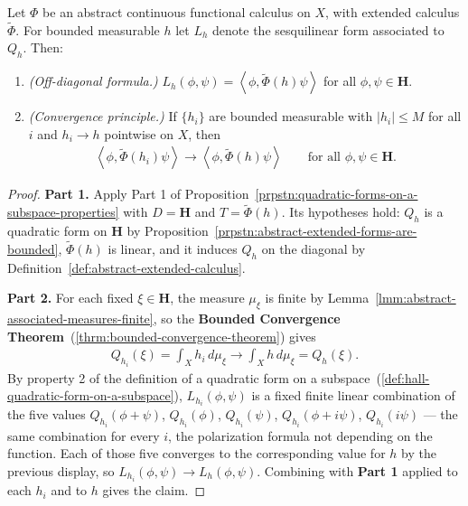 \begin{lemma}
    \label{lmm:abstract-extended-convergence}
    \leanok
    Let $\Phi$ be an abstract continuous functional calculus on $X$, with extended calculus $\widetilde\Phi$. For bounded measurable $h$ let $L_h$ denote the sesquilinear form associated to $Q_h$. Then:
    \begin{enumerate}
        \item \textit{(Off-diagonal formula.)} $L_h(\phi,\psi) = \left< \phi, \widetilde\Phi(h)\psi \right>$ for all $\phi,\psi \in \mathbf{H}$.
        \item \textit{(Convergence principle.)} If $\{h_i\}$ are bounded measurable with $\lvert h_i \rvert \le M$ for all $i$ and $h_i \to h$ pointwise on $X$, then
        \begin{align}
            \left< \phi, \widetilde\Phi(h_i)\psi \right> \longrightarrow \left< \phi, \widetilde\Phi(h)\psi \right> \qquad \text{for all } \phi,\psi \in \mathbf{H}.
        \end{align}
    \end{enumerate}
\end{lemma}
\begin{proof}
    \leanok
\textbf{Part 1.} Apply Part 1 of Proposition~\ref{prpstn:quadratic-forms-on-a-subspace-properties} with $D = \mathbf{H}$ and $T = \widetilde\Phi(h)$. Its hypotheses hold: $Q_h$ is a quadratic form on $\mathbf{H}$ by Proposition~\ref{prpstn:abstract-extended-forms-are-bounded}, $\widetilde\Phi(h)$ is linear, and it induces $Q_h$ on the diagonal by Definition~\ref{def:abstract-extended-calculus}.

\textbf{Part 2.} For each fixed $\xi \in \mathbf{H}$, the measure $\mu_\xi$ is finite by Lemma~\ref{lmm:abstract-associated-measures-finite}, so the \textbf{Bounded Convergence Theorem}~(\ref{thrm:bounded-convergence-theorem}) gives
\begin{align}
    Q_{h_i}(\xi) = \int_X h_i \, d\mu_\xi \longrightarrow \int_X h \, d\mu_\xi = Q_h(\xi).
\end{align}
By property 2 of the definition of a quadratic form on a subspace~(\ref{def:hall-quadratic-form-on-a-subspace}), $L_{h_i}(\phi,\psi)$ is a fixed finite linear combination of the five values $Q_{h_i}(\phi+\psi)$, $Q_{h_i}(\phi)$, $Q_{h_i}(\psi)$, $Q_{h_i}(\phi+i\psi)$, $Q_{h_i}(i\psi)$ — the same combination for every $i$, the polarization formula not depending on the function. Each of those five converges to the corresponding value for $h$ by the previous display, so $L_{h_i}(\phi,\psi) \to L_h(\phi,\psi)$. Combining with \textbf{Part 1} applied to each $h_i$ and to $h$ gives the claim.
\end{proof}

